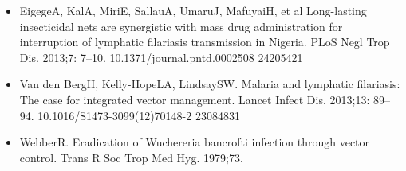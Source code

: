 \documentclass[11pt,a4paper]{article}
\begin{document}
\begin{itemize}
\item EigegeA, KalA, MiriE, SallauA, UmaruJ, MafuyaiH, et al Long-lasting insecticidal nets are synergistic with mass drug administration for interruption of lymphatic filariasis transmission in Nigeria. PLoS Negl Trop Dis. 2013;7: 7–10. 10.1371/journal.pntd.0002508 24205421
\item Van den BergH, Kelly-HopeLA, LindsaySW. Malaria and lymphatic filariasis: The case for integrated vector management. Lancet Infect Dis. 2013;13: 89–94. 10.1016/S1473-3099(12)70148-2 23084831
\item WebberR. Eradication of Wuchereria bancrofti infection through vector control. Trans R Soc Trop Med Hyg. 1979;73.
\end{itemize}
\end{document}
